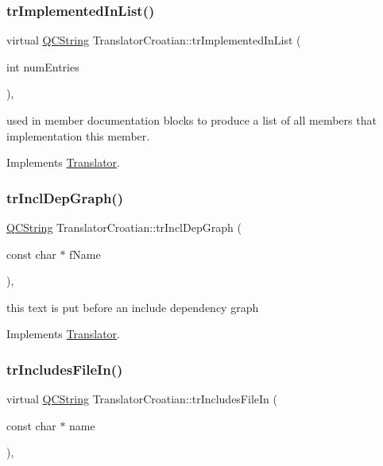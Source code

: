\subsubsection{\texorpdfstring{trImplementedInList()}{trImplementedInList()}}
{\footnotesize\ttfamily virtual \mbox{\hyperlink{class_q_c_string}{Q\+C\+String}} Translator\+Croatian\+::tr\+Implemented\+In\+List (\begin{DoxyParamCaption}\item[{int}]{num\+Entries }\end{DoxyParamCaption})\hspace{0.3cm}{\ttfamily [inline]}, {\ttfamily [virtual]}}

used in member documentation blocks to produce a list of all members that implementation this member. 

Implements \mbox{\hyperlink{class_translator}{Translator}}.

\mbox{\label{class_translator_croatian_adbf1e568674c1ac0c714d666a3850a6c}} 
\subsubsection{\texorpdfstring{trInclDepGraph()}{trInclDepGraph()}}
{\footnotesize\ttfamily \mbox{\hyperlink{class_q_c_string}{Q\+C\+String}} Translator\+Croatian\+::tr\+Incl\+Dep\+Graph (\begin{DoxyParamCaption}\item[{const char $\ast$}]{f\+Name }\end{DoxyParamCaption})\hspace{0.3cm}{\ttfamily [inline]}, {\ttfamily [virtual]}}

this text is put before an include dependency graph 

Implements \mbox{\hyperlink{class_translator}{Translator}}.

\mbox{\label{class_translator_croatian_a5ca15edc2f650155561cb3a4e409e5a7}} 
\subsubsection{\texorpdfstring{trIncludesFileIn()}{trIncludesFileIn()}}
{\footnotesize\ttfamily virtual \mbox{\hyperlink{class_q_c_string}{Q\+C\+String}} Translator\+Croatian\+::tr\+Includes\+File\+In (\begin{DoxyParamCaption}\item[{const char $\ast$}]{name }\end{DoxyParamCaption})\hspace{0.3cm}{\ttfamily [inline]}, {\ttfamily [virtual]}}

